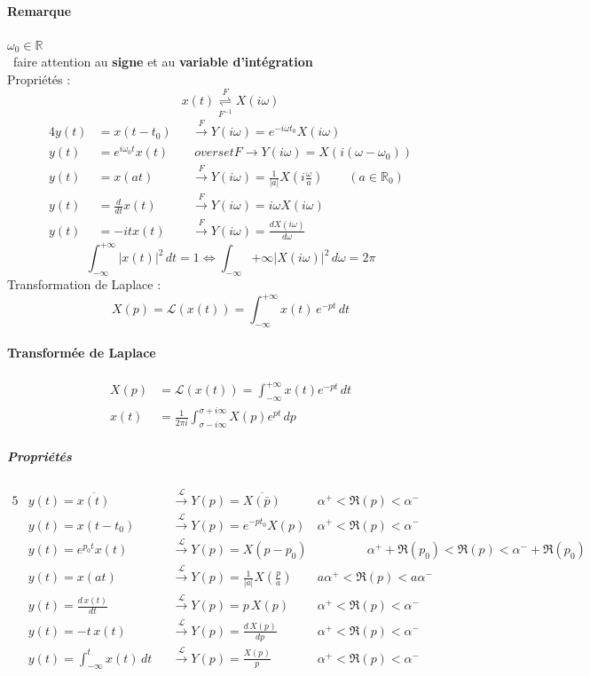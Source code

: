 \paragraph{Remarque} $\omega_0\in\mathbb{R}$\\ \danger\ faire attention au \textbf{signe} et au \textbf{variable d'intégration}\\
Propriétés : 
$$x(t)\overset{F}{\underset{F^{-1}}{\rightleftharpoons}}X(i\omega)$$
\begin{alignat*}{4}
y(t) &= x(t-t_0) &&\overset{F}{\rightarrow} Y(i\omega)=e^{-i\omega t_0}X(i\omega)\\
y(t) &= e^{i\omega_0t}x(t) &&\
overset{F}{\rightarrow} Y(i\omega)=X(i(\omega-\omega_0))\\ 
y(t) &= x(at) &&\overset{F}{\rightarrow} Y(i\omega)=\frac{1}{|a|}X\left(i\frac{\omega}{a}\right)\qquad (a\in\mathbb{R}_0)\\
y(t) &= \frac{d}{dt}x(t) &&\overset{F}{\rightarrow} Y(i\omega)=i\omega X(i\omega)\\
y(t) &= -itx(t) &&\overset{F}{\rightarrow} Y(i\omega)=\frac{dX(i\omega)}{d\omega}
\end{alignat*}
$$\int_{-\infty}^{+\infty}|x(t)|^2\,dt=1\Leftrightarrow\int_{-\infty}{+\infty}|X(i\omega)|^2\,d\omega=2\pi $$
Transformation de Laplace : 
$$X(p)=\mathcal{L}(x(t))=\int_{-\infty}^{+\infty}x(t)\,e^{-pt}\,dt $$

\paragraph{Transformée de Laplace} \begin{align*}X(p) &=\mathcal{L}(x(t))=\int_{-\infty}^ {+\infty}x(t)e^ {-pt}\,dt\\
x(t) &= \frac{1}{2\pi i}\int_{\sigma-i\infty}^ {\sigma+i\infty}X(p)e^{pt}\,dp
\end{align*}
\subparagraph{Propriétés} \begin{alignat*}{5}
& y(t)=\overline{x(t)} &&\overset{\mathcal{L}}{\rightarrow} Y(p)=\overline{X(\bar{p})} & \alpha^+<\Re(p)<\alpha^-\\
& y(t)=x(t-t_0) &&\overset{\mathcal{L}}{\rightarrow} Y(p)=e^{-pt_0}X(p) & \alpha^+<\Re(p)<\alpha^- \\
& y(t)=e^{p_0t}x(t) &&\overset{\mathcal{L}}{\rightarrow} Y(p)= X(p-p_0) & \qquad\qquad\alpha^++\Re(p_0)<\Re(p)<\alpha^-+\Re(p_0)\\
& y(t)=x(at) &&\overset{\mathcal{L}}{\rightarrow} Y(p) = \frac{1}{|a|}X\left(\frac{p}{a}\right) & a\alpha^+<\Re(p)<a\alpha^-\\
& y(t)=\frac{d\,x(t)}{dt} &&\overset{\mathcal{L}}{\rightarrow} Y(p) =p\,X(p) & \alpha^+<\Re(p)<\alpha^-\\
& y(t)=-t\,x(t) &&\overset{\mathcal{L}}{\rightarrow}  Y(p)=\frac{d\,X(p)}{dp} & \alpha^+<\Re(p)<\alpha^-\\
& y(t)=\int_{-\infty}^t x(t)\,dt &&\overset{\mathcal{L}}{\rightarrow}  Y(p)=\frac{X(p)}{p} &  \alpha^+<\Re(p)<\alpha^-
\end{alignat*}
